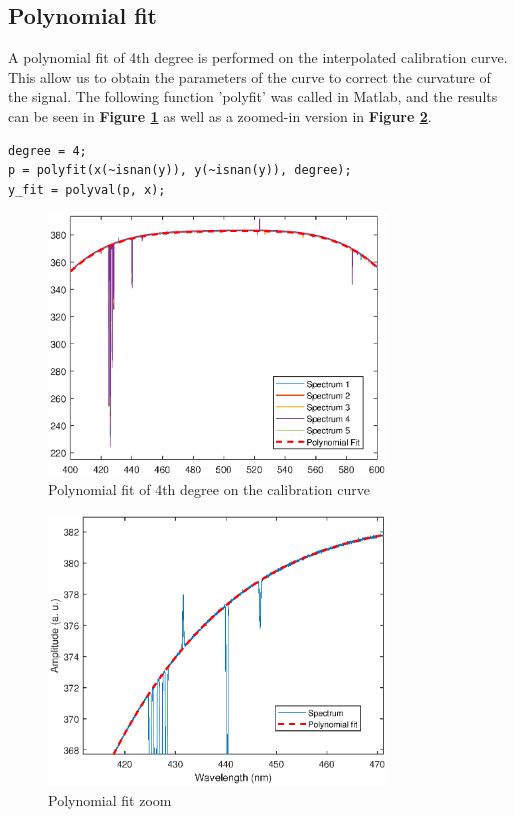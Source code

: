 \subsection{Polynomial fit}
A polynomial fit of 4th degree is performed on the interpolated calibration curve. This allow us to obtain the parameters of the curve to correct the curvature of the signal. The following function 'polyfit'\cite{polyfit} was called in Matlab, and the results can be seen in \textbf{Figure \ref{fig:Figure 8}} as well as a zoomed-in version in \textbf{Figure \ref{fig:Figure 9}}.
\begin{lstlisting}
degree = 4;
p = polyfit(x(~isnan(y)), y(~isnan(y)), degree);
y_fit = polyval(p, x);
\end{lstlisting}
\begin{figure}[H]
    \centering
    \includegraphics[width = 0.8\textwidth ]{figures/polyfit.eps}
    \caption{Polynomial fit of 4th degree on the calibration curve}
    \label{fig:Figure 8}
\end{figure}
\begin{figure}[H]
    \centering
    \includegraphics[width = 0.8\textwidth ]{figures/polyfit_zoom.eps}
    \caption{Polynomial fit zoom }
    \label{fig:Figure 9}
\end{figure}

